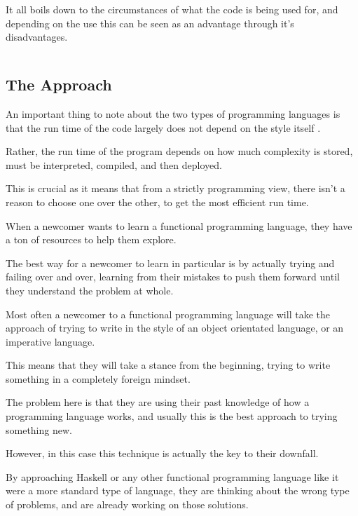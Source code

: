 \documentclass{article}
\begin{document}
\medskip\noindent
It all boils down to the circumstances of what the code is being used for, and depending on the use this can be seen as an advantage through it's disadvantages.  

\medskip\medskip
\begin{lstlisting}
\end{lstlisting}

\medskip

\subsection{The Approach}
\medskip\medskip
\hspace{\parindent} 

An important thing to note about the two types of programming languages is that the run time of the code largely does not depend on the style itself \cite{IC}. 

\medskip\noindent
Rather, the run time of the program depends on how much complexity is stored, must be interpreted, compiled, and then deployed.  

\medskip\noindent
This is crucial as it means that from a strictly programming view, there isn't a reason to choose one over the other, to get the most efficient run time. 

\medskip\noindent
When a newcomer wants to learn a functional programming language, they have a ton of resources to help them explore. 

\medskip\noindent
The best way for a newcomer to learn in particular is by actually trying and failing over and over, learning from their mistakes to push them forward until they understand the problem at whole. 

\medskip\noindent
Most often a newcomer to a functional programming language will take the approach of trying to write in the style of an object orientated language, or an imperative language. 

\medskip\noindent
This means that they will take a stance from the beginning, trying to write something in a completely foreign mindset. 

\medskip\noindent
The problem here is that they are using their past knowledge of how a programming language works, and usually this is the best approach to trying something new. 

\medskip\noindent
However, in this case this technique is actually the key to their downfall.  

\medskip\noindent
By approaching Haskell or any other functional programming language like it were a more standard type of language, they are thinking about the wrong type of problems, and are already working on those solutions. 
\medskip\noindent
\end{document}
